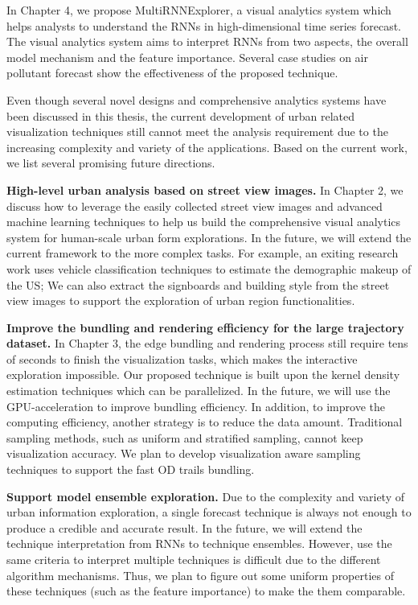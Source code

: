 In Chapter 4, we propose MultiRNNExplorer, a visual analytics system which helps analysts to understand the RNNs in high-dimensional time series forecast. The visual analytics system aims to interpret RNNs from two aspects, the overall model mechanism and the feature importance. Several case studies on air pollutant forecast show the effectiveness of the proposed technique.

Even though several novel designs and comprehensive analytics systems have been discussed in this thesis, the current development of urban related visualization techniques still cannot meet the analysis requirement due to the increasing complexity and variety of the applications. Based on the current work, we list several promising future directions.

\textbf{High-level urban analysis based on street view images.} In Chapter 2, we discuss how to leverage the easily collected street view images and advanced machine learning techniques to help us build the comprehensive visual analytics system for human-scale urban form explorations. In the future, we will extend the current framework to the more complex tasks. For example, an exiting research work uses vehicle classification techniques to estimate the demographic makeup of the US; We can also extract the signboards and building style from the street view images to support the exploration of urban region  functionalities.  

\textbf{Improve the bundling and rendering efficiency for the large trajectory dataset.} In Chapter 3, the edge bundling and rendering process still require tens of seconds to finish the visualization tasks, which makes the interactive exploration impossible. Our proposed technique is built upon the kernel density estimation techniques which can be parallelized. In the future, we will use the GPU-acceleration to improve bundling efficiency. In addition, to improve the computing efficiency, another strategy is to reduce the data amount. Traditional sampling methods, such as uniform and stratified sampling, cannot keep visualization accuracy. We plan to develop visualization aware sampling techniques to support the fast OD trails bundling. 

\textbf{Support model ensemble exploration.} Due to the complexity and variety of urban information exploration, a single forecast technique is always not enough to produce a credible and accurate result. In the future, we will extend the technique interpretation from RNNs to technique ensembles. However, use the same criteria to interpret multiple techniques is difficult due to the different algorithm mechanisms. Thus, we plan to figure out some uniform properties of these techniques (such as the feature importance) to make the them comparable. 